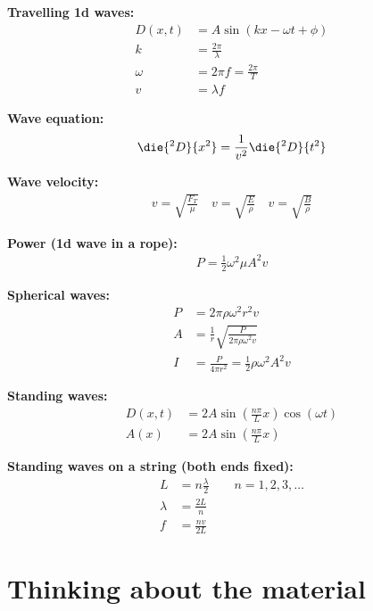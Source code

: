 \newpage
\begin{importantEquations}
\begin{multicols}{2}
\textbf{Travelling 1d waves:}
\begin{align*}
D(x,t) &= A \sin(kx-\omega t + \phi)\\
k &= \frac{2\pi}{\lambda}\\
\omega &= 2\pi f = \frac{2\pi}{T}\\
v &= \lambda f
\end{align*}

\textbf{Wave equation:}
\begin{align*}
\die{^2D}{x^2}=\frac{1}{v^2}\die{^2D}{t^2}
\end{align*}

\textbf{Wave velocity:}
\begin{align*}
v=\sqrt{\frac{F_T}{\mu}} \quad v=\sqrt{\frac{E}{\rho}} \quad v=\sqrt{\frac{B}{\rho}}
\end{align*}


\textbf{Power (1d wave in a rope):}
\begin{align*}
P = \frac{1}{2}\omega^2\mu A^2 v 
\end{align*}

\columnbreak

\textbf{Spherical waves:}
\begin{align*}
P &= 2\pi\rho\omega^2r^2 v\\
A &=\frac{1}{r}\sqrt{\frac{P}{2\pi\rho \omega^2 v}}\\
I&=\frac{P}{4\pi r^2}=\frac{1}{2}\rho\omega^2A^2v
\end{align*}

\textbf{Standing waves:}
\begin{align*}
D(x,t)&=2A\sin\left(\frac{n\pi}{L}x\right)\cos(\omega t)\\
A(x) &= 2A\sin\left(\frac{n\pi}{L}x\right)
\end{align*}

\textbf{Standing waves on a string (both ends fixed):}
\begin{align*}
L &= n\frac{\lambda}{2}\quad\quad n=1,2,3,\dots\\
\lambda &= \frac{2L}{n}\\
f &= \frac{nv}{2L}
\end{align*}
\end{multicols}
\end{importantEquations}


\newpage
\section{Thinking about the material}

